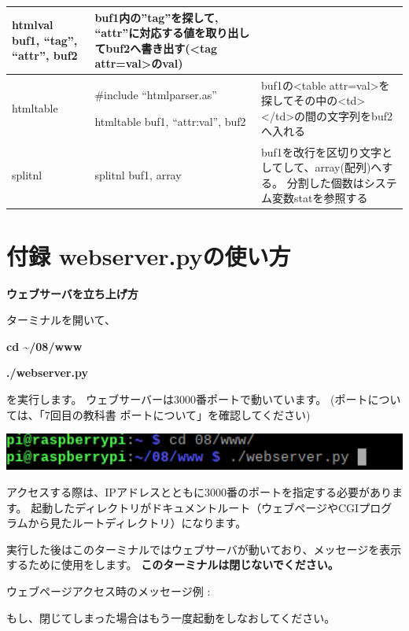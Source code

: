 \documentclass[a4paper,12pt,dvipdfmx]{jarticle}
\begin{document}
\begin{center}
\begin{supertabular}{|m{2.349cm}|m{7.57cm}|m{6.487cm}|}
htmlval buf1, “tag”, “attr”, buf2 &
buf1内の”tag”を探して,
“attr”に対応する値を取り出してbuf2へ書き出す({\textless}tag
attr=val{\textgreater}のval)\\\hline
htmltable &
\#include “htmlparser.as”

htmltable buf1, “attr:val”, buf2 &
buf1の{\textless}table
attr=val{\textgreater}を探してその中の{\textless}td{\textgreater}{\textless}/td{\textgreater}の間の文字列をbuf2へ入れる\\\hline
splitnl &
splitnl buf1, array &
buf1を改行を区切り文字としてして、array(配列)へする。
分割した個数はシステム変数statを参照する\\\hline
\end{supertabular}
\end{center}
\section{付録 webserver.pyの使い方}
{\bfseries
ウェブサーバを立ち上げ方}

ターミナルを開いて、

\textbf{cd {\textasciitilde}/08/www}

\textbf{./webserver.py}

を実行します。
ウェブサーバーは3000番ポートで動いています。
(ポートについては、「7回目の教科書
ポートについて」を確認してください)%


\begin{center}
\includegraphics[width=17.006cm]{textbook-img063.png}

\end{center}
アクセスする際は、IPアドレスとともに3000番のポートを指定する必要があります。
起動したディレクトリがドキュメントルート（ウェブページやCGIプログラムから見たルートディレクトリ）になります。


実行した後はこのターミナルではウェブサーバが動いており、メッセージを表示するために使用をします。
\textbf{このターミナルは閉じないでください。}

ウェブページアクセス時のメッセージ例
:

もし、閉じてしまった場合はもう一度起動をしなおしてください。
\end{document}
